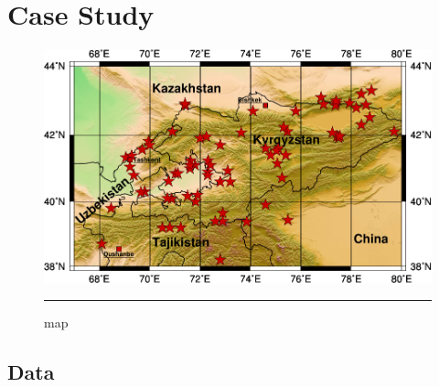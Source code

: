 
\chapter{Case Study} %

\label{Chapter4} %


\begin{figure}[!htpb]
	\centering
		\includegraphics[scale=0.9]{Figures/CentralAsia.pdf}
		\rule{35em}{0.5pt}
	\caption[map]{map}
	\label{fig:map}
\end{figure}

\section{Data}


